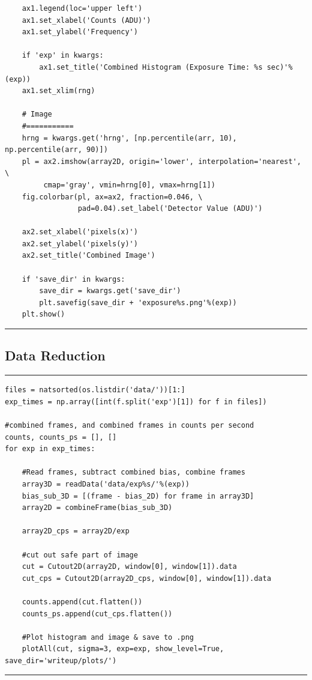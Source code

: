 \documentclass[preprint]{aastex62}
\begin{document}
\begin{lstlisting}
    ax1.legend(loc='upper left')
    ax1.set_xlabel('Counts (ADU)')
    ax1.set_ylabel('Frequency')
    
    if 'exp' in kwargs:
        ax1.set_title('Combined Histogram (Exposure Time: %s sec)'%(exp))
    ax1.set_xlim(rng)
    
    # Image
    #===========
    hrng = kwargs.get('hrng', [np.percentile(arr, 10), np.percentile(arr, 90)])
    pl = ax2.imshow(array2D, origin='lower', interpolation='nearest', \
         cmap='gray', vmin=hrng[0], vmax=hrng[1])
    fig.colorbar(pl, ax=ax2, fraction=0.046, \
                 pad=0.04).set_label('Detector Value (ADU)')
    
    ax2.set_xlabel('pixels(x)')
    ax2.set_ylabel('pixels(y)')
    ax2.set_title('Combined Image')
    
    if 'save_dir' in kwargs:
        save_dir = kwargs.get('save_dir')
        plt.savefig(save_dir + 'exposure%s.png'%(exp))
    plt.show()
\end{lstlisting}
\hrule \vspace{7pt}

\subsection{Data Reduction} \label{code:reduction} 
\hrule
\begin{lstlisting}
files = natsorted(os.listdir('data/'))[1:]
exp_times = np.array([int(f.split('exp')[1]) for f in files])

#combined frames, and combined frames in counts per second
counts, counts_ps = [], []
for exp in exp_times:
    
    #Read frames, subtract combined bias, combine frames
    array3D = readData('data/exp%s/'%(exp))
    bias_sub_3D = [(frame - bias_2D) for frame in array3D]
    array2D = combineFrame(bias_sub_3D)
    
    array2D_cps = array2D/exp
    
    #cut out safe part of image
    cut = Cutout2D(array2D, window[0], window[1]).data
    cut_cps = Cutout2D(array2D_cps, window[0], window[1]).data
    
    counts.append(cut.flatten())
    counts_ps.append(cut_cps.flatten())
    
    #Plot histogram and image & save to .png
    plotAll(cut, sigma=3, exp=exp, show_level=True, save_dir='writeup/plots/')
\end{lstlisting}
\hrule \vspace{7pt}
\end{document}
